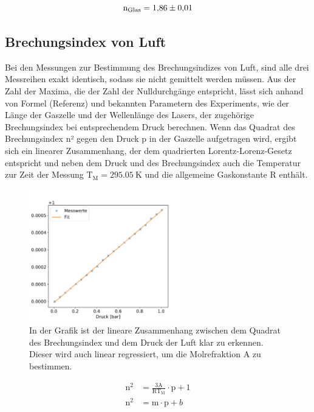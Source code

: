         \begin{equation}
            \text{n}_{\text{Glas}} = \num{1.86 +- 0.01}
        \end{equation}


    \subsection{Brechungsindex von Luft}
        Bei den Messungen zur Bestimmung des Brechungsindizes von Luft, sind alle drei Messreihen exakt identisch, sodass sie nicht gemittelt werden müssen. Aus der Zahl der Maxima, die der Zahl der 
        Nulldurchgänge entspricht, lässt sich anhand von Formel (Referenz) und bekannten Parametern des Experiments, wie der Länge der Gaszelle und der Wellenlänge des Lasers, der zugehörige Brechungsindex
        bei entsprechendem Druck berechnen. Wenn das Quadrat des Brechungsindex n² gegen den Druck p in der Gaszelle aufgetragen wird, ergibt sich ein linearer Zusammenhang, der dem quadrierten Lorentz-Lorenz-Gesetz entspricht und neben dem Druck und des Brechungsindex auch die Temperatur zur Zeit der Messung $\text{T}_{\text{M}}=\SI{295.05}{\kelvin}$ und die allgemeine Gaskonstante R enthält. 


        \FloatBarrier

        \begin{figure}[h]
          \centering
          \includegraphics[width = 0.6\textwidth]{pictures/n_quad_fit.pdf}
          \caption{In der Grafik ist der lineare Zusammenhang zwischen dem Quadrat des Brechungsindex und dem Druck der Luft klar zu erkennen. Dieser wird auch linear regressiert, um die Molrefraktion A zu bestimmen.}
          \label{fig:Aufbau}
        \end{figure}

        \FloatBarrier

        \begin{align}
            \text{n}^2 &= \frac{3\text{A}}{\text{RT}_{\text{M}}} \cdot \text{p} + 1 \\
            \text{n}^2 &= \text{m} \cdot \text{p} + b
        \end{align}


